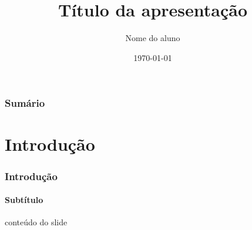 \documentclass{beamer}
\title[identificação curta]{Título da apresentação}
\author[identificação curta]{Nome do aluno}
\institute[UnB]{Universidade de Brasília}
\date[identificação curta]{\today}
\begin{document}
  \frame{\titlepage} %
  \begin{frame} %
    \frametitle{Sumário}
    \tableofcontents
  \end{frame}
  \section{Introdução}
  \begin{frame} %
    \frametitle{Introdução}
    \framesubtitle{Subtítulo}
    conteúdo do slide
  \end{frame}
\end{document}

